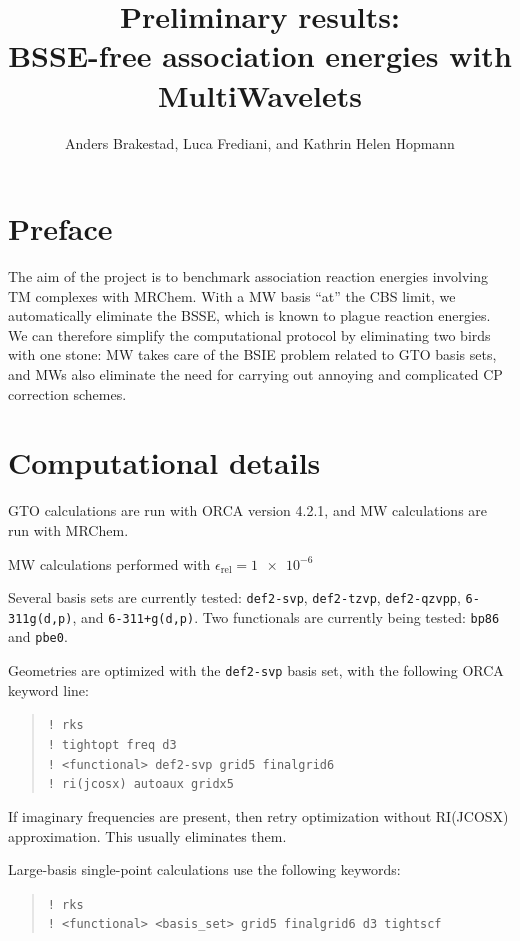 \documentclass[11pt,a4paper]{article}
\author{Anders Brakestad, Luca Frediani, and Kathrin Helen Hopmann}
\title{Preliminary results: \\ BSSE-free association energies with MultiWavelets}
\begin{document}
	\maketitle
	\tableofcontents

\setcounter{secnumdepth}{2}

\section{Preface}
The aim of the project is to benchmark association reaction energies involving TM complexes with MRChem.
With a MW basis ``at'' the CBS limit, we automatically eliminate the BSSE, which is known to plague reaction energies.
We can therefore simplify the computational protocol by eliminating two birds with one stone: MW takes care of the BSIE problem related to GTO basis sets, and MWs also eliminate the need for carrying out annoying and complicated CP correction schemes.


\section{Computational details}
GTO calculations are run with ORCA version 4.2.1, and MW calculations are run with MRChem.

MW calculations performed with $\epsilon_{\text{rel}} = \num{1e-6}$

Several basis sets are currently tested: \verb|def2-svp|, \verb|def2-tzvp|, \verb|def2-qzvpp|, \verb|6-311g(d,p)|, and \verb|6-311+g(d,p)|.
Two functionals are currently being tested: \verb|bp86| and \verb|pbe0|.

Geometries are optimized with the \verb|def2-svp| basis set, with the following ORCA keyword line:

\begin{quote}
	\verb|! rks| \\
	\verb|! tightopt freq d3| \\
	\verb|! <functional> def2-svp grid5 finalgrid6| \\ 
	\verb|! ri(jcosx) autoaux gridx5|
\end{quote}

If imaginary frequencies are present, then retry optimization without RI(JCOSX) approximation.
This usually eliminates them.

Large-basis single-point calculations use the following keywords:

\begin{quote}
	\verb|! rks| \\
	\verb|! <functional> <basis_set> grid5 finalgrid6 d3 tightscf|
\end{quote}
\end{document}
